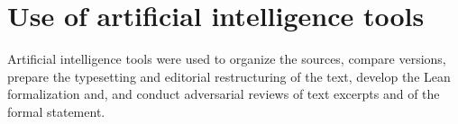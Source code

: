 \section*{Use of artificial intelligence tools}
{}

Artificial intelligence tools were used to organize the sources, compare versions, prepare the typesetting
and editorial restructuring
of the text\ifverificacionLean, develop the Lean formalization and\else, and\fi{} conduct adversarial
reviews of text
excerpts\ifverificacionLean{} and of the formal statement\fi.
